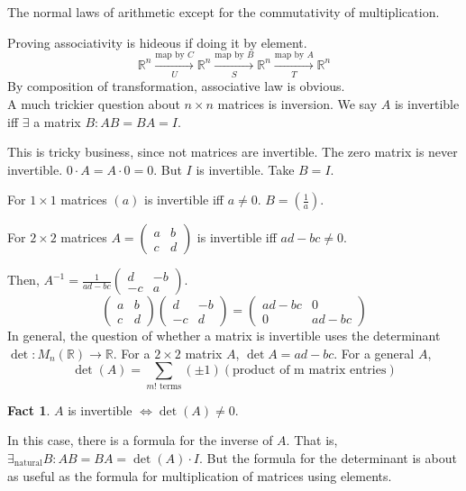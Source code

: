 \documentclass[12pt]{article}
\newcommand{\RR}{\mathbb{R}}
\theoremstyle{definition}
\newtheorem*{fact}{Fact}
\begin{document}
The normal laws of arithmetic except for the commutativity of multiplication.

Proving associativity is hideous if doing it by element.
\[\RR^n\xrightarrow[U]{\text{map by } C}\RR^n\xrightarrow[S]{\text{map by } B}\RR^n\xrightarrow[T]{\text{map by } A}\RR^n\]
By composition of transformation, associative law is obvious.
\\

A much trickier question about \(n \times n\) matrices is inversion.
We say \(A\) is invertible iff \(\exists \) a matrix \(B : AB = BA = I\).

This is tricky business, since not matrices are invertible. The zero matrix is never invertible.
\( 0\cdot A = A \cdot 0 = 0\). But \(I\) is invertible. Take \(B=I\).

For \(1 \times 1\) matrices \((a)\) is invertible iff \(a \neq 0\). \(B = (\frac{1}{a})\).

For \(2 \times 2\) matrices \(A = \left(\begin{smallmatrix}
    a & b\\
    c & d
\end{smallmatrix}\right)\) is invertible iff \(ad - bc \neq 0\).

Then, \(A^{-1}=\frac{1}{ad-bc}\left(\begin{smallmatrix}
    d & -b\\
    -c & a
\end{smallmatrix}\right)\).
\[
\begin{pmatrix}
    a & b\\
    c & d
\end{pmatrix}
\begin{pmatrix}
    d & -b\\
    -c & d
\end{pmatrix}
=
\begin{pmatrix}
    ad-bc & 0\\
    0 & ad-bc 
\end{pmatrix}
\]
In general, the question of whether a matrix is invertible
uses the determinant \(\det : M_n(\RR)\rightarrow\RR \).
For a \(2 \times 2\) matrix \(A\), \(\det A = ad-bc\).
For a general \(A\), \[\det(A) = \sum_{m! \text{ terms}}(\pm1)(\text{product of m matrix entries})\]
\begin{fact}
\(A\) is invertible \(\iff \det(A)\neq 0\).
\end{fact}
In this case, there is a formula for the inverse of \(A\).
That is, \(\exists_{\text{natural}} B: AB = BA = \det(A)\cdot I\).
But the formula for the determinant is about as useful as the formula
for multiplication of matrices using elements.
\end{document}

